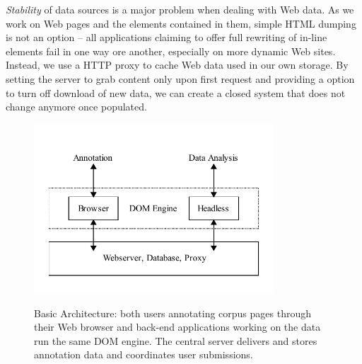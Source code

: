 \textit{Stability} of data sources is a major problem when dealing with Web data.
As we work on Web pages and the elements contained in them, simple HTML dumping is not an option -- all applications claiming to offer full rewriting of in-line elements fail in one way ore another, especially on more dynamic Web sites.
Instead, we use a HTTP proxy to cache Web data used in our own storage.
By setting the server to grab content only upon first request and providing a option to turn off download of new data, we can create a closed system that does not change anymore once populated.

\begin{figure}
	{\includegraphics[width=0.8\textwidth]{arch}}
\caption{\label{f:arch}Basic {\KrdWrd} Architecture: both users annotating corpus pages through their Web browser
and back-end applications working on the data run the same DOM engine.
	The central server delivers and stores annotation data and coordinates user submissions.}
\end{figure}
